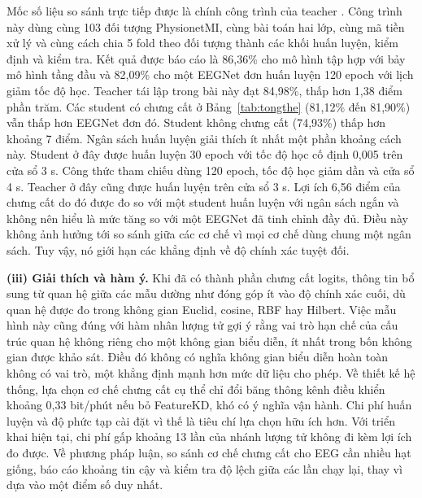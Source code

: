 Mốc số liệu so sánh trực tiếp được là chính công trình của teacher
\cite{zoumpourlis2024motor}. Công trình này dùng cùng 103 đối tượng
PhysionetMI, cùng bài toán hai lớp, cùng mã tiền xử lý và cùng cách chia
5 fold theo đối tượng thành các khối huấn luyện, kiểm định và kiểm tra. Kết
quả được báo cáo là 86,36\% cho mô hình tập hợp với bảy mô hình tầng đầu và
82,09\% cho một EEGNet đơn huấn luyện 120 epoch với lịch giảm tốc độ học.
Teacher tái lập trong bài này đạt 84,98\%, thấp hơn 1,38 điểm phần trăm. Các
student có chưng cất ở Bảng~\ref{tab:tongthe} (81,12\% đến 81,90\%) vẫn thấp
hơn EEGNet đơn đó. Student không chưng cất (74,93\%) thấp hơn khoảng 7 điểm.
Ngân sách huấn luyện giải thích ít nhất một phần khoảng cách này. Student ở
đây được huấn luyện 30 epoch với tốc độ học cố định 0,005 trên cửa sổ 3 s.
Công thức tham chiếu dùng 120 epoch, tốc độ học giảm dần và cửa sổ 4 s.
Teacher ở đây cũng được huấn luyện trên cửa sổ 3 s. Lợi ích 6,56 điểm của
chưng cất do đó được đo so với một student huấn luyện với ngân sách ngắn và
không nên hiểu là mức tăng so với một EEGNet đã tinh chỉnh đầy đủ. Điều này
không ảnh hưởng tới so sánh giữa các cơ chế vì mọi cơ chế dùng chung một
ngân sách. Tuy vậy, nó giới hạn các khẳng định về độ chính xác tuyệt đối.

\textbf{(iii) Giải thích và hàm ý.} Khi đã có thành phần chưng cất logits,
thông tin bổ sung từ quan hệ giữa các mẫu dường như đóng góp ít vào độ
chính xác cuối, dù quan hệ được đo trong không gian Euclid, cosine, RBF hay
Hilbert. Việc mẫu hình này cũng đúng với hàm nhân lượng tử gợi ý rằng vai trò hạn chế
của cấu trúc quan hệ không riêng cho một không gian biểu diễn, ít nhất trong
bốn không gian được khảo sát. Điều đó không có nghĩa không gian biểu
diễn hoàn toàn không có vai trò, một khẳng định mạnh hơn mức dữ liệu cho
phép. Về thiết kế hệ thống, lựa chọn cơ chế chưng cất cụ thể chỉ đổi băng
thông kênh điều khiển khoảng 0,33 bit/phút nếu bỏ FeatureKD, khó có ý nghĩa vận hành. Chi phí huấn luyện và độ phức tạp
cài đặt vì thế là tiêu chí lựa chọn hữu ích hơn. Với triển khai hiện tại, chi phí gấp khoảng 13 lần
của nhánh lượng tử không đi kèm lợi ích đo được. Về phương pháp luận, so
sánh cơ chế chưng cất cho EEG cần nhiều hạt giống, báo cáo khoảng tin cậy
và kiểm tra độ lệch giữa các lần chạy lại, thay vì dựa vào một điểm số duy
nhất.

